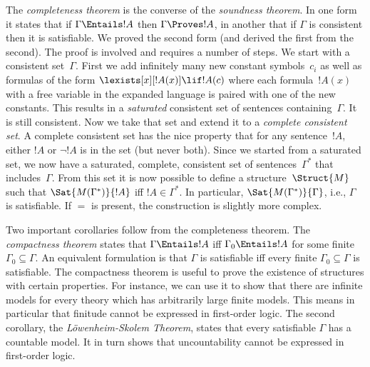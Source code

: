 The \emph{completeness theorem} is the converse of the \emph{soundness
  theorem}. In one form it states that if $\Gamma \Entails !A$ then
$\Gamma \Proves !A$, in another that if $\Gamma$ is consistent then it
is satisfiable. We proved the second form (and derived the first from
the second). The proof is involved and requires a number of steps. We
start with a consistent set~$\Gamma$. First we add infinitely many
new constant symbols~$c_i$ as well as formulas of the form
$\lexists[x][!A(x)] \lif !A(c)$ where each formula~$!A(x)$ with a free
variable in the expanded language is paired with one of the new
constants. This results in a \emph{saturated} consistent set of
sentences containing~$\Gamma$. It is still consistent. Now we take
that set and extend it to a \emph{complete consistent set}. A
complete consistent set has the nice property that for any
sentence~$!A$, either $!A$ or $\lnot !A$ is in the set (but never
both). Since we started from a saturated set, we now have a saturated,
complete, consistent set of sentences~$\Gamma^*$ that
includes~$\Gamma$. From this set it is now possible to define a
structure~$\Struct{M}$ such that $\Sat{M(\Gamma^*)}{!A}$ iff
$!A \in \Gamma^*$. In particular, $\Sat{M(\Gamma^*)}{\Gamma}$, i.e.,
$\Gamma$ is satisfiable. If $=$ is present, the construction is
slightly more complex.

Two important corollaries follow from the completeness theorem. The
\emph{compactness theorem} states that $\Gamma \Entails !A$ iff
$\Gamma_0 \Entails !A$ for some finite $\Gamma_0 \subseteq \Gamma$. An
equivalent formulation is that $\Gamma$ is satisfiable iff every
finite $\Gamma_0 \subseteq \Gamma$ is satisfiable. The compactness
theorem is useful to prove the existence of structures with certain
properties. For instance, we can use it to show that there are
infinite models for every theory which has arbitrarily large finite
models. This means in particular that finitude cannot be expressed in
first-order logic. The second corollary, the \emph{L\"owenheim-Skolem
  Theorem}, states that every satisfiable $\Gamma$ has a countable
model. It in turn shows that uncountability cannot be expressed in
first-order logic.
